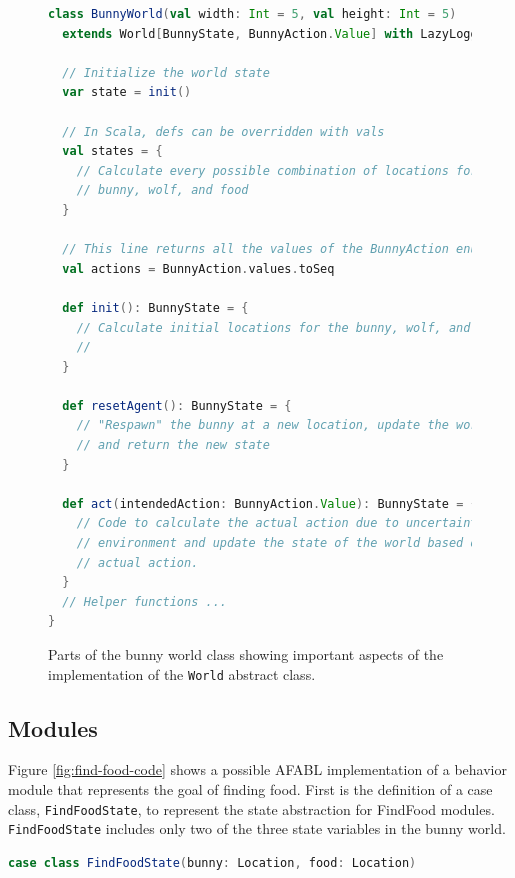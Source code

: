 \begin{figure}[!h]
\begin{center}
\small
\begin{lstlisting}[language=Scala]
class BunnyWorld(val width: Int = 5, val height: Int = 5)
  extends World[BunnyState, BunnyAction.Value] with LazyLogging {

  // Initialize the world state
  var state = init()

  // In Scala, defs can be overridden with vals
  val states = {
    // Calculate every possible combination of locations for the
    // bunny, wolf, and food
  }

  // This line returns all the values of the BunnyAction enumeration
  val actions = BunnyAction.values.toSeq

  def init(): BunnyState = {
    // Calculate initial locations for the bunny, wolf, and food.
    //
  }

  def resetAgent(): BunnyState = {
    // "Respawn" the bunny at a new location, update the world state
    // and return the new state
  }

  def act(intendedAction: BunnyAction.Value): BunnyState = {
    // Code to calculate the actual action due to uncertainty in the
    // environment and update the state of the world based on the
    // actual action.
  }
  // Helper functions ...
}
\end{lstlisting}
\normalsize
\caption{Parts of the bunny world class showing important aspects of the implementation of the {\tt World} abstract class.}
\end{center}
\label{fig:bunny-world-code}
\end{figure}


\subsection{Modules}\label{sec:afabl-modules}

Figure \ref{fig:find-food-code} shows a possible AFABL implementation of a behavior module that represents the goal of finding food. First is the definition of a case class, {\tt FindFoodState}, to represent the state abstraction for FindFood modules. {\tt FindFoodState} includes only two of the three state variables in the bunny world.

\begin{center}
\begin{lstlisting}[language=Scala,frame=none]
case class FindFoodState(bunny: Location, food: Location)
\end{lstlisting}
\end{center}

